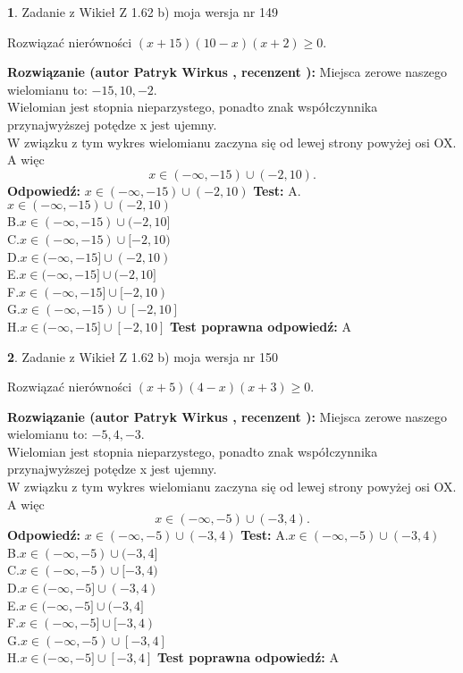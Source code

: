 \documentclass[12pt, a4paper]{article}
\theoremstyle{definition} %
\newtheorem{zad}{}
\newcommand{\zadStart}[1]{\begin{zad}#1\newline}
\newcommand{\zadStop}{\end{zad}}
\newcommand{\rozwStart}[2]{\noindent \textbf{Rozwiązanie (autor #1 , recenzent #2): }\newline}
\newcommand{\rozwStop}{\newline}
\newcommand{\odpStart}{\noindent \textbf{Odpowiedź:}\newline}
\newcommand{\odpStop}{\newline}
\newcommand{\testStart}{\noindent \textbf{Test:}\newline}
\newcommand{\testStop}{\newline}
\newcommand{\kluczStart}{\noindent \textbf{Test poprawna odpowiedź:}\newline}
\newcommand{\kluczStop}{\newline}
\begin{document}
\zadStart{Zadanie z Wikieł Z 1.62 b) moja wersja nr 149}

Rozwiązać nierówności $(x+15)(10-x)(x+2)\ge0$.
\zadStop
\rozwStart{Patryk Wirkus}{}
Miejsca zerowe naszego wielomianu to: $-15, 10, -2$.\\
Wielomian jest stopnia nieparzystego, ponadto znak współczynnika przy\linebreak najwyższej potędze x jest ujemny.\\ W związku z tym wykres wielomianu zaczyna się od lewej strony powyżej osi OX. A więc $$x \in (-\infty,-15) \cup (-2,10).$$
\rozwStop
\odpStart
$x \in (-\infty,-15) \cup (-2,10)$
\odpStop
\testStart
A.$x \in (-\infty,-15) \cup (-2,10)$\\
B.$x \in (-\infty,-15) \cup (-2,10]$\\
C.$x \in (-\infty,-15) \cup [-2,10)$\\
D.$x \in (-\infty,-15] \cup (-2,10)$\\
E.$x \in (-\infty,-15] \cup (-2,10]$\\
F.$x \in (-\infty,-15] \cup [-2,10)$\\
G.$x \in (-\infty,-15) \cup [-2,10]$\\
H.$x \in (-\infty,-15] \cup [-2,10]$
\testStop
\kluczStart
A
\kluczStop



\zadStart{Zadanie z Wikieł Z 1.62 b) moja wersja nr 150}

Rozwiązać nierówności $(x+5)(4-x)(x+3)\ge0$.
\zadStop
\rozwStart{Patryk Wirkus}{}
Miejsca zerowe naszego wielomianu to: $-5, 4, -3$.\\
Wielomian jest stopnia nieparzystego, ponadto znak współczynnika przy\linebreak najwyższej potędze x jest ujemny.\\ W związku z tym wykres wielomianu zaczyna się od lewej strony powyżej osi OX. A więc $$x \in (-\infty,-5) \cup (-3,4).$$
\rozwStop
\odpStart
$x \in (-\infty,-5) \cup (-3,4)$
\odpStop
\testStart
A.$x \in (-\infty,-5) \cup (-3,4)$\\
B.$x \in (-\infty,-5) \cup (-3,4]$\\
C.$x \in (-\infty,-5) \cup [-3,4)$\\
D.$x \in (-\infty,-5] \cup (-3,4)$\\
E.$x \in (-\infty,-5] \cup (-3,4]$\\
F.$x \in (-\infty,-5] \cup [-3,4)$\\
G.$x \in (-\infty,-5) \cup [-3,4]$\\
H.$x \in (-\infty,-5] \cup [-3,4]$
\testStop
\kluczStart
A
\kluczStop
\end{document}

